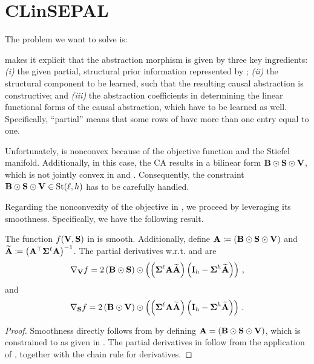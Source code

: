 \section{CLinSEPAL}\label{app:MADMMSCA_partial}
The problem we want to solve is:

\smoothpartial*

 makes it explicit that the abstraction morphism is given by three key ingredients: \emph{(i)} the given partial, structural prior information represented by \B; \emph{(ii)} the structural component \Supp to be learned, such that the resulting causal abstraction is constructive; and \emph{(iii)} the abstraction coefficients in \V determining the linear functional forms of the causal abstraction, which have to be learned as well.
Specifically, \enquote{partial} means that some rows of \B have more than one entry equal to one.

Unfortunately,  is nonconvex because of the objective function and the Stiefel manifold.
Additionally, in this case, the CA results in a bilinear form $\mathbf{B}\odot \mathbf{S} \odot \mathbf{V}$, which is not jointly convex in \Supp and \V.
Consequently, the constraint $\mathbf{B}\odot \mathbf{S} \odot \mathbf{V} \in \mathrm{St}({\ell},{h})$ has to be carefully handled.

Regarding the nonconvexity of the objective in , we proceed by leveraging its smoothness.
Specifically, we have the following result.

\begin{corollary}\label{corollary:objective_partial_knowledge}
    The function $f(\mathbf{V}, \mathbf{S})$ in  is smooth.
    Additionally, define $\mathbf{A}\coloneqq\left(\mathbf{B} \odot \mathbf{S} \odot \mathbf{V}\right)$ and $\widetilde{\mathbf{A}}\coloneqq\left(\mathbf{A}^\top \boldsymbol{\Sigma}^{\ell} \mathbf{A}\right)^{-1}$.
    The partial derivatives w.r.t. \V and \Supp are
    \begin{equation}\label{eq:gradV_partial}
        \nabla_{\mathbf{V}} f = 2\left(\mathbf{B} \odot \mathbf{S}\right) \odot \left(\left(\boldsymbol{\Sigma}^{\ell}\mathbf{A}\widetilde{\mathbf{A}}\right)\left(\mathbf{I}_h - \boldsymbol{\Sigma}^{h}\widetilde{\mathbf{A}}\right)\right)\,,
    \end{equation}
    and
    \begin{equation}\label{eq:gradS_partial}
        \nabla_{\mathbf{S}} f = 2\left(\mathbf{B} \odot \mathbf{V}\right) \odot \left(\left(\boldsymbol{\Sigma}^{\ell}\mathbf{A}\widetilde{\mathbf{A}}\right)\left(\mathbf{I}_h - \boldsymbol{\Sigma}^{h}\widetilde{\mathbf{A}}\right)\right)\,.
    \end{equation}
\end{corollary}
\begin{proof}
    Smoothness directly follows from  by defining $\mathbf{A}=\left(\mathbf{B} \odot \mathbf{S} \odot \mathbf{V}\right)$, which is constrained to  as given in .
    The partial derivatives in  follow from the application of , together with the chain rule for derivatives. 
\end{proof}

